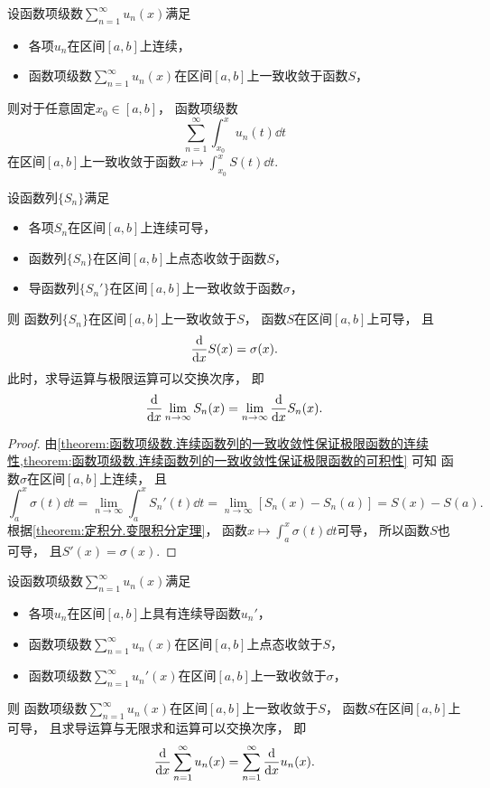 \begin{proposition}
设函数项级数\(\sum_{n=1}^\infty u_n(x)\)满足\begin{itemize}
	\item 各项\(u_n\)在区间\([a,b]\)上连续，
	\item 函数项级数\(\sum_{n=1}^\infty u_n(x)\)在区间\([a,b]\)上一致收敛于函数\(S\)，
\end{itemize}
则对于任意固定\(x_0\in[a,b]\)，
函数项级数\[
	\sum_{n=1}^\infty \int_{x_0}^x u_n(t) \dd{t}
\]在区间\([a,b]\)上一致收敛于函数\(x \mapsto \int_{x_0}^x S(t) \dd{t}\).
\end{proposition}

\begin{theorem}\label{theorem:函数项级数.连续可导函数列的点态收敛性及其导函数列的一致收敛性保证极限函数的可微性}
设函数列\(\{S_n\}\)满足\begin{itemize}
	\item 各项\(S_n\)在区间\([a,b]\)上连续可导，
	\item 函数列\(\{S_n\}\)在区间\([a,b]\)上点态收敛于函数\(S\)，
	\item 导函数列\(\{S_n'\}\)在区间\([a,b]\)上一致收敛于函数\(\sigma\)，
\end{itemize}
则
函数列\(\{S_n\}\)在区间\([a,b]\)上一致收敛于\(S\)，
函数\(S\)在区间\([a,b]\)上可导，
且\[
	\dv{x} S(x) = \sigma(x).
\]
此时，求导运算与极限运算可以交换次序，
即\[
	\dv{x} \lim_{n\to\infty} S_n(x)
	= \lim_{n\to\infty} \dv{x} S_n(x).
\]
\begin{proof}
由\cref{theorem:函数项级数.连续函数列的一致收敛性保证极限函数的连续性,theorem:函数项级数.连续函数列的一致收敛性保证极限函数的可积性} 可知
函数\(\sigma\)在区间\([a,b]\)上连续，
且\[
	\int_a^x \sigma(t) \dd{t}
	= \lim_{n\to\infty} \int_a^x S_n'(t) \dd{t}
	= \lim_{n\to\infty} [S_n(x) - S_n(a)]
	= S(x) - S(a).
\]
根据\cref{theorem:定积分.变限积分定理}，
函数\(x \mapsto \int_a^x \sigma(t) \dd{t}\)可导，
所以函数\(S\)也可导，
且\(S'(x) = \sigma(x)\).
\end{proof}
\end{theorem}
\begin{theorem}
设函数项级数\(\sum_{n=1}^\infty u_n(x)\)满足\begin{itemize}
	\item 各项\(u_n\)在区间\([a,b]\)上具有连续导函数\(u_n'\)，
	\item 函数项级数\(\sum_{n=1}^\infty u_n(x)\)在区间\([a,b]\)上点态收敛于\(S\)，
	\item 函数项级数\(\sum_{n=1}^\infty u_n'(x)\)在区间\([a,b]\)上一致收敛于\(\sigma\)，
\end{itemize}
则
函数项级数\(\sum_{n=1}^\infty u_n(x)\)在区间\([a,b]\)上一致收敛于\(S\)，
函数\(S\)在区间\([a,b]\)上可导，
且求导运算与无限求和运算可以交换次序，
即\[
	\dv{x} \sum_{n=1}^\infty u_n(x)
	= \sum_{n=1}^\infty \dv{x} u_n(x).
\]
\end{theorem}
